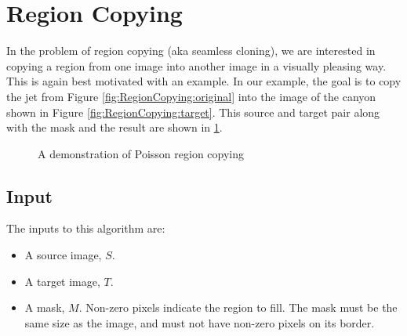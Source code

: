 \documentclass{InsightArticle}
\begin{document}
\section{Region Copying}
\label{sec:RegionCopying}
In the problem of region copying (aka seamless cloning), we are interested in copying a region from one image into another image in a visually pleasing way. This is again best motivated with an example. In our example, the goal is to copy the jet from Figure \ref{fig:RegionCopying:original} into the image of the canyon shown in Figure \ref{fig:RegionCopying:target}. This source and target pair along with the mask and the result are shown in \ref{fig:RegionCopying}.

\begin{figure}[H]
\centering
{}
\caption{A demonstration of Poisson region copying}
\label{fig:RegionCopying}
\end{figure}

\subsection{Input}
The inputs to this algorithm are:
\begin{itemize}
\item A source image, $S$.
\item A target image, $T$.
\item A mask, $M$. Non-zero pixels indicate the region to fill. The mask must be the same size as the image, and must not have non-zero pixels on its border.
\end{itemize}
\end{document}
